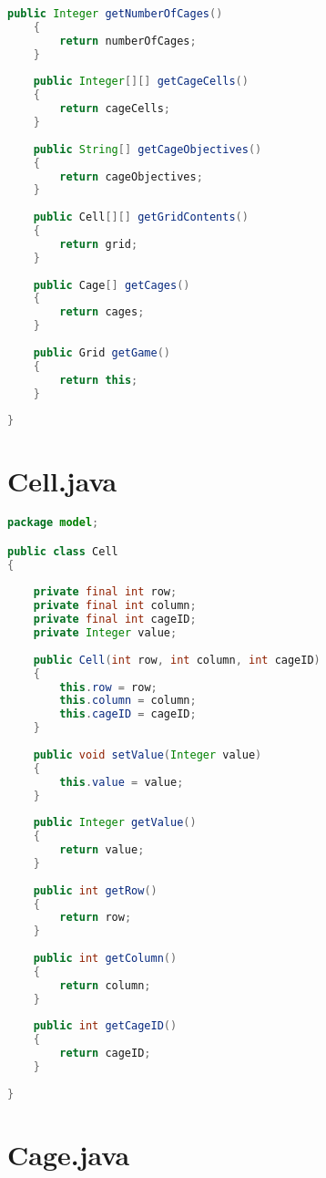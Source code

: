 \begin{lstlisting}[language=Java,basicstyle=\tiny,caption=Grid.java]
    public Integer getNumberOfCages()
    {
        return numberOfCages;
    }
    
    public Integer[][] getCageCells()
    {
        return cageCells;
    } 
    
    public String[] getCageObjectives()
    {
        return cageObjectives;
    }
    
    public Cell[][] getGridContents()
    {
        return grid;
    }
    
    public Cage[] getCages()
    {
        return cages;
    }
    
    public Grid getGame()
    {
        return this;
    }
    
}
\end{lstlisting}

\section{Cell.java}
\label{sec:kodeprogramcell}

\begin{lstlisting}[language=Java,basicstyle=\tiny,caption=Cell.java]
package model;

public class Cell
{
    
    private final int row;
    private final int column;
    private final int cageID;
    private Integer value;
    
    public Cell(int row, int column, int cageID)
    {
        this.row = row;
        this.column = column;
        this.cageID = cageID;
    }
    
    public void setValue(Integer value)
    {
        this.value = value;
    }
    
    public Integer getValue()
    {
        return value;
    }
    
    public int getRow()
    {
        return row;
    }
     
    public int getColumn()
    {
        return column;
    }
    
    public int getCageID()
    {
        return cageID;
    }
    
}
\end{lstlisting}

\section{Cage.java}
\label{sec:kodeprogramcage}

